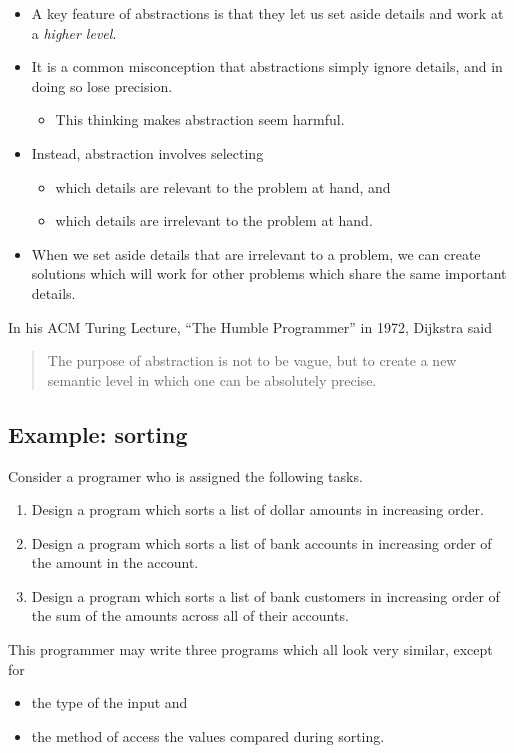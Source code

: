 \documentclass[11pt]{article}
\theoremstyle{definition}
\begin{document}
\begin{itemize}
\item A key feature of abstractions is that they let us set aside details
and work at a \emph{higher level}.
\item It is a common misconception that abstractions simply ignore details,
and in doing so lose precision.
\begin{itemize}
\item This thinking makes abstraction seem harmful.
\end{itemize}
\item Instead, abstraction involves selecting
\begin{itemize}
\item which details are relevant to the problem at hand, and
\item which details are irrelevant to the problem at hand.
\end{itemize}
\item When we set aside details that are irrelevant to a problem,
we can create solutions which will work for other problems
which share the same important details.
\end{itemize}

In his ACM Turing Lecture, “The Humble Programmer” in 1972, Dijkstra said
\begin{quote}
The purpose of abstraction is not to be vague, but to create
a new semantic level in which one can be absolutely precise.
\end{quote}

\subsection{Example: sorting}
\label{sec:orgdbf00c9}

Consider a programer who is assigned the following tasks.
\begin{enumerate}
\item Design a program which sorts a list of
dollar amounts in increasing order.
\item Design a program which sorts a list of
bank accounts in increasing order of the amount in the account.
\item Design a program which sorts a list of
bank customers in increasing order of the sum of the amounts
across all of their accounts.
\end{enumerate}

This programmer may write three programs which all look very similar,
except for
\begin{itemize}
\item the type of the input and
\item the method of access the values compared during sorting.
\end{itemize}
\end{document}
